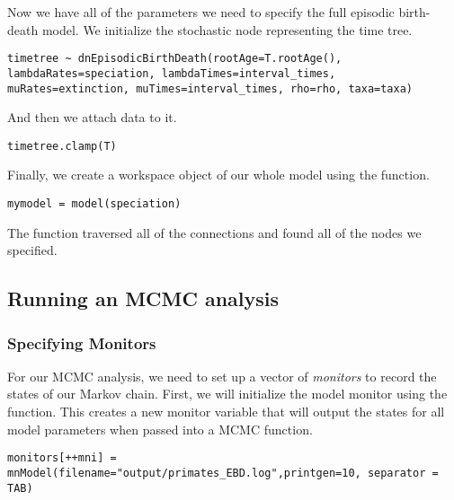 Now we have all of the parameters we need to specify the full episodic birth-death model. 
We initialize the stochastic node representing the time tree.
{\tt \begin{snugshade*}
\begin{lstlisting}
timetree ~ dnEpisodicBirthDeath(rootAge=T.rootAge(), lambdaRates=speciation, lambdaTimes=interval_times, muRates=extinction, muTimes=interval_times, rho=rho, taxa=taxa)
\end{lstlisting}
\end{snugshade*}}
And then we attach data to it.
{\tt \begin{snugshade*}
\begin{lstlisting}
timetree.clamp(T)
\end{lstlisting}
\end{snugshade*}}

Finally, we create a workspace object of our whole model using the  function. 
{\tt \begin{snugshade*}
\begin{lstlisting}
mymodel = model(speciation)
\end{lstlisting}
\end{snugshade*}}

The  function traversed all of the connections and found all of the nodes we specified. 


\subsection{Running an MCMC analysis}

\subsubsection{Specifying Monitors}

For our MCMC analysis, we need to set up a vector of \textit{monitors} to record the states of our Markov chain. 
First, we will initialize the model monitor using the  function. This creates a new monitor variable that will output the states for all model parameters when passed into a MCMC function. 
{\tt \begin{snugshade*}
\begin{lstlisting}
monitors[++mni] = mnModel(filename="output/primates_EBD.log",printgen=10, separator = TAB)
\end{lstlisting}
\end{snugshade*}}

